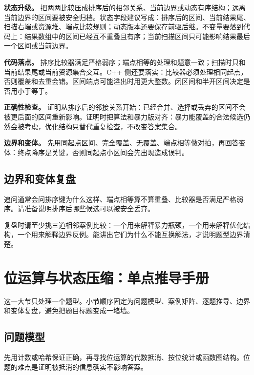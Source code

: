 \textbf{状态升级。} 把两两比较压成排序后的相邻关系、当前边界或动态有序结构；远离当前边界的区间要被安全归档。状态字段建议写成：排序后的区间、当前结果尾、扫描右端或资源堆、端点比较规则；动态版本还要保存前驱后继。不变量要落到代码上：结果数组中的区间已经互不重叠且有序；当前扫描区间只可能影响结果最后一个区间或当前边界。

\textbf{代码落点。} 排序比较器满足严格弱序；端点相等的处理和题意一致；扫描时只和当前结果尾或当前资源集合交互。C++ 侧还要落实：比较器必须处理相同起点，否则覆盖和去重会错。区间端点可能溢出时用更大整数。闭区间和半开区间决定是否用小于等于。

\textbf{正确性检查。} 证明从排序后的邻接关系开始：已经合并、选择或丢弃的区间不会被更后面的区间重新影响。证明时把算法和暴力版对齐：暴力能覆盖的合法候选仍然会被考虑，优化结构只替代重复检查，不改变答案集合。

\textbf{边界和变体。} 先用同起点区间、完全覆盖、无覆盖、端点相等做对拍，再回答变体：终点降序是关键，否则同起点小区间会先出现造成误判。

\subsection{边界和变体复盘}

追问通常会问排序键为什么这样、端点相等算不算重叠、比较器是否满足严格弱序。请准备说明排序后哪些候选可以被安全丢弃。

复盘时请至少挑三道相邻案例比较：一个用来解释暴力瓶颈，一个用来解释优化结构，一个用来解释边界反例。能讲出它们为什么不能互换解法，才说明题型边界清楚。

\section{位运算与状态压缩：单点推导手册}
这一大节只处理一个题型。小节顺序固定为问题模型、案例矩阵、逐题推导、边界和变体复盘，避免把题目标题变成一堵墙。

\subsection{问题模型}

先用计数或哈希保证正确，再寻找位运算的代数抵消、按位统计或函数图结构。位题的难点是证明被抵消的信息确实不影响答案。

